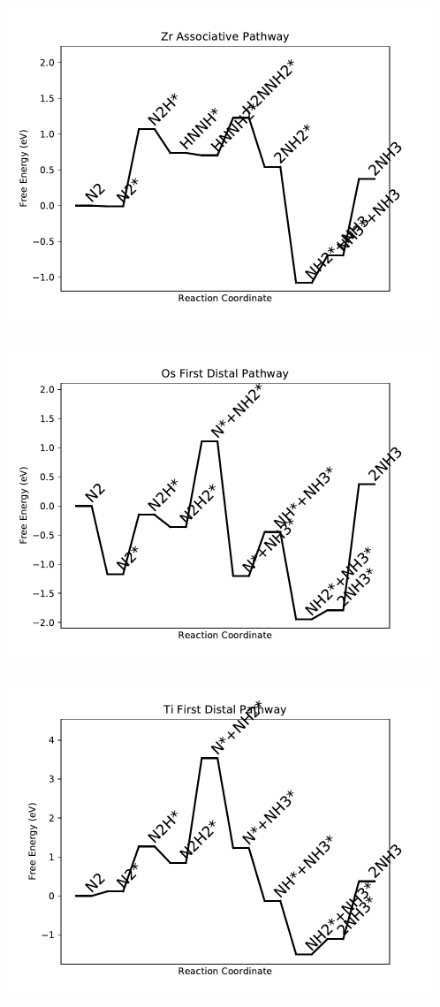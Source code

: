 \begin{figure}
\centering
\includegraphics[width=0.8\linewidth]{data/plots/Zr_associative.pdf}
\end{figure}

\begin{figure}
\centering
\includegraphics[width=0.8\linewidth]{data/plots/Os_distal_1.pdf}
\end{figure}

\begin{figure}
\centering
\includegraphics[width=0.8\linewidth]{data/plots/Ti_distal_1.pdf}
\end{figure}

